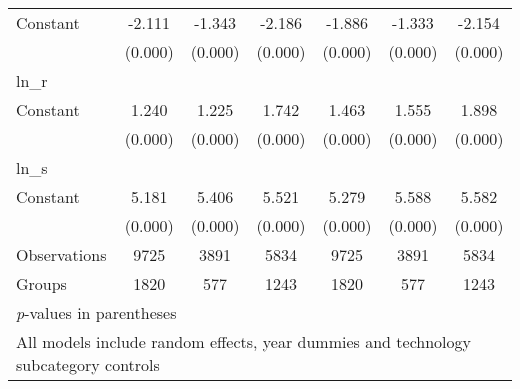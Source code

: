 \begin{sidewaystable}[htbp]
\begin{tabular}{l*{6}{c}}
Constant        &   -2.111&   -1.343&   -2.186&   -1.886&   -1.333&   -2.154\\
                &  (0.000)&  (0.000)&  (0.000)&  (0.000)&  (0.000)&  (0.000)\\
\hline
ln\_r            &         &         &         &         &         &         \\
Constant        &    1.240&    1.225&    1.742&    1.463&    1.555&    1.898\\
                &  (0.000)&  (0.000)&  (0.000)&  (0.000)&  (0.000)&  (0.000)\\
\hline
ln\_s            &         &         &         &         &         &         \\
Constant        &    5.181&    5.406&    5.521&    5.279&    5.588&    5.582\\
                &  (0.000)&  (0.000)&  (0.000)&  (0.000)&  (0.000)&  (0.000)\\
\hline
Observations    &     9725&     3891&     5834&     9725&     3891&     5834\\
Groups          &     1820&      577&     1243&     1820&      577&     1243\\
\hline\hline
\multicolumn{7}{l}{\footnotesize \textit{p}-values in parentheses}\\
\multicolumn{7}{l}{\footnotesize All models include random effects, year dummies and technology subcategory controls}\\
\end{tabular}
\end{sidewaystable}
